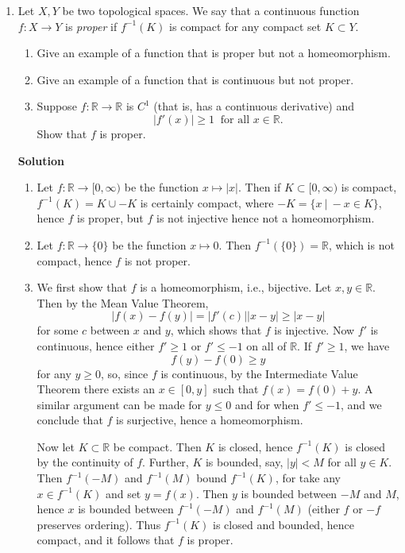 \documentclass{article}
\begin{document}
\begin{enumerate}
\item Let \(X,Y\) be two topological spaces.  We say that a continuous function \(f : X \to Y\) is {\em proper} if \(f^{-1}(K)\) is compact for any compact set \(K \subset Y\).

\begin{enumerate}
\item Give an example of a function that is proper but not a homeomorphism.

\item Give an example of a function that is continuous but not proper.

\item Suppose \(f : \mathbb{R} \to \mathbb{R}\) is \(C^1\) (that is, has a continuous derivative) and
\[|f'(x)| \geq 1 \ \text{ for all } x \in \mathbb{R}.\]
Show that \(f\) is proper.

\end{enumerate}

{\bf Solution}

\begin{enumerate}
\item Let \(f : \mathbb{R} \to [0,\infty)\) be the function \(x \mapsto |x|\).  Then if \(K \subset [0,\infty)\) is compact, \(f^{-1}(K) = K \cup -K\) is certainly compact, where \(-K = \{x \ | \ -x \in K\}\), hence \(f\) is proper, but \(f\) is not injective hence not a homeomorphism.

\item Let \(f :\mathbb{R} \to \{0\}\) be the function \(x \mapsto 0\).  Then \(f^{-1}(\{0\}) = \mathbb{R}\), which is not compact, hence \(f\) is not proper.

\item We first show that \(f\) is a homeomorphism, i.e., bijective.  Let \(x,y \in \mathbb{R}\).  Then by the Mean Value Theorem,
\[|f(x) - f(y)| = |f'(c)| |x - y| \geq |x - y|\]
for some \(c\) between \(x\) and \(y\), which shows that \(f\) is injective.  Now \(f'\) is continuous, hence either \(f' \geq 1\) or \(f' \leq -1\) on all of \(\mathbb{R}\).  If \(f' \geq 1\), we have
\[f(y) - f(0) \geq y\]
for any \(y \geq 0\), so, since \(f\) is continuous, by the Intermediate Value Theorem there exists an \(x \in [0,y]\) such that \(f(x) = f(0) + y\).  A similar argument can be made for \(y \leq 0\) and for when \(f' \leq -1\), and we conclude that \(f\) is surjective, hence a homeomorphism.

Now let \(K \subset \mathbb{R}\) be compact.  Then \(K\) is closed, hence \(f^{-1}(K)\) is closed by the continuity of \(f\).  Further, \(K\) is bounded, say, \(|y| < M\) for all \(y \in K\).  Then \(f^{-1}(-M)\) and \(f^{-1}(M)\) bound \(f^{-1}(K)\), for take any \(x \in f^{-1}(K)\) and set \(y = f(x)\).  Then \(y\) is bounded between \(-M\) and \(M\), hence \(x\) is bounded between \(f^{-1}(-M)\) and \(f^{-1}(M)\) (either \(f\) or \(-f\) preserves ordering).  Thus \(f^{-1}(K)\) is closed and bounded, hence compact, and it follows that \(f\) is proper.


\end{enumerate}
\end{enumerate}
\end{document}
